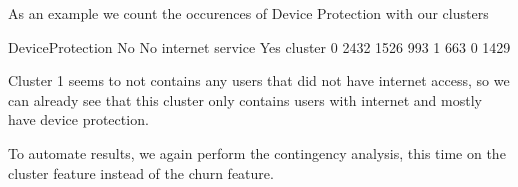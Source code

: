 \documentclass[letterpaper,10pt,english]{jupyterBook}
\begin{document}
\sphinxAtStartPar
As an example we count the occurences of Device Protection with our clusters

\begin{sphinxVerbatim}[commandchars=\\\{\}]
\end{sphinxVerbatim}

\begin{sphinxVerbatim}[commandchars=\\\{\}]
DeviceProtection    No  No internet service   Yes
cluster                                          
0                 2432                 1526   993
1                  663                    0  1429
\end{sphinxVerbatim}

\sphinxAtStartPar
Cluster 1 seems to not contains any users that did not have internet access, so we can already see that this cluster only contains users with internet and mostly have device protection.

\sphinxAtStartPar
To automate results, we again perform the contingency analysis, this time on the cluster feature instead of the churn feature.
\end{document}
